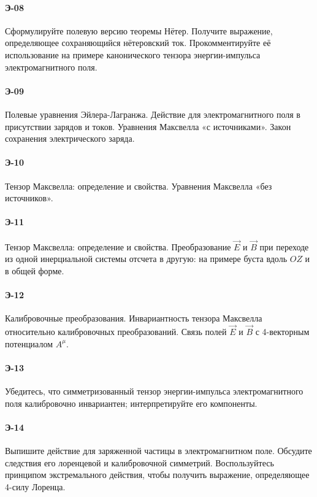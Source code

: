\paragraph{Э-08}
Сформулируйте полевую версию теоремы Нётер. Получите выражение, определяющее сохраняющийся нётеровский ток. Прокомментируйте её использование на примере канонического тензора энергии-импульса электромагнитного поля.

\paragraph{Э-09}
Полевые уравнения Эйлера-Лагранжа. Действие для электромагнитного поля в присутствии зарядов и токов. Уравнения Максвелла «с источниками». Закон сохранения электрического заряда.

\paragraph{Э-10}
Тензор Максвелла: определение и свойства. Уравнения Максвелла «без источников».

\paragraph{Э-11}
Тензор Максвелла: определение и свойства. Преобразование $\vec E$ и $\vec B$ при переходе из одной инерциальной системы отсчета в другую: на примере буста вдоль $OZ$ и в общей форме.

\paragraph{Э-12}
Калибровочные преобразования. Инвариантность тензора Максвелла относительно калибровочных преобразований. Связь полей $\vec E$ и $\vec B$ с 4-векторным потенциалом $A^\mu$.

\paragraph{Э-13}
Убедитесь, что симметризованный тензор энергии-импульса электромагнитного поля калибровочно инвариантен; интерпретируйте его компоненты.

\paragraph{Э-14}
Выпишите действие для заряженной частицы в электромагнитном поле. Обсудите следствия его лоренцевой и калибровочной симметрий. Воспользуйтесь принципом экстремального действия, чтобы получить выражение, определяющее 4-силу Лоренца.


